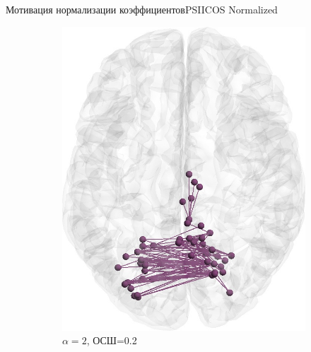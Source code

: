 \documentclass[12pt]{beamer}
\begin{document}
\begin{frame}[t]{Мотивация нормализации коэффициентов}{PSIICOS Normalized}
\begin{figure}[htbp]
\begin{subfigure}[t]{0.24\textwidth}
            \includegraphics[width=0.99\linewidth]{../images/loreta_brain_jitter_2_snr_02_phase_lag_07854.jpg}
            \caption{\tiny $\alpha=2$, ОСШ=0.2}\label{fig:unbiased_1_ntw_b}
        \end{subfigure}
        \begin{subfigure}[t]{0.24\textwidth}

\end{subfigure}
\end{figure}
\end{frame}
\end{document}
